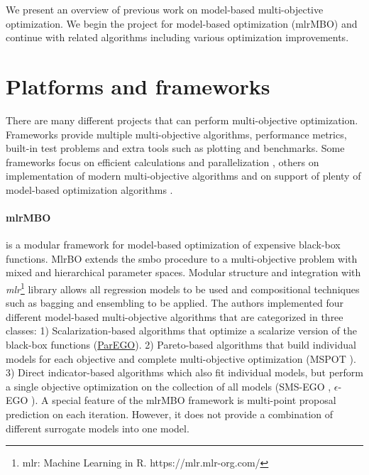         We present an overview of previous work on model-based multi-objective optimization. We begin the project for model-based optimization (mlrMBO) and continue with related algorithms including various optimization improvements.




    \section{Platforms and frameworks}
        There are many different projects that can perform multi-objective optimization. Frameworks provide multiple multi-objective algorithms, performance metrics, built-in test problems and extra tools such as plotting and benchmarks. Some frameworks focus on efficient calculations and parallelization \cite{francesco_biscani_2019}, others on implementation of modern multi-objective algorithms \cite{benitezhidalgo2019jmetalpy, TianPlatEMO} and on support of plenty of model-based optimization algorithms \cite{BischlmlrMBO}.

        \paragraph{mlrMBO}\cite{BischlmlrMBO} is a modular framework for model-based optimization of expensive black-box functions. MlrBO extends the \gls{smbo} procedure to a multi-objective problem with mixed and hierarchical parameter spaces. Modular structure and integration with \emph{mlr}\footnote{{mlr}: Machine Learning in R. https://mlr.mlr-org.com/} library allows all regression models to be used and compositional techniques such as bagging and ensembling to be applied. The authors implemented four different model-based multi-objective algorithms that are categorized in three classes: 1) Scalarization-based algorithms that optimize a scalarize version of the black-box functions (\hyperref[alg:ParEGO]{ParEGO}). 2) Pareto-based algorithms that build individual models for each objective and complete multi-objective optimization (MSPOT \cite{ZaeffererBNWE13}). 3) Direct indicator-based algorithms which also fit individual models, but perform a single objective optimization on the collection of all models (SMS-EGO \cite{inproceedings}, $\epsilon$-EGO \cite{WagEGOe}).
        A special feature of the mlrMBO framework is multi-point proposal prediction on each iteration. However, it does not provide a combination of different surrogate models into one model.
       
